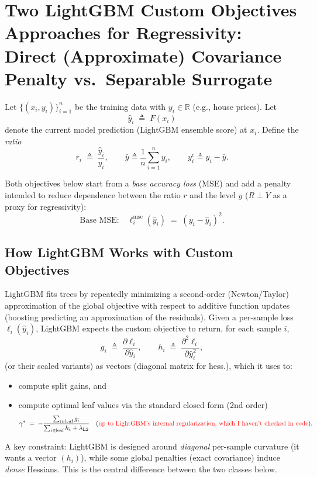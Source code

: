\documentclass[11pt]{article}
\theoremstyle{plain}
\theoremstyle{definition}
\newcommand{\1}{\mathbf{1}}
\begin{document}
\newpage 

\section{Two LightGBM Custom Objectives Approaches for Regressivity: Direct (Approximate) Covariance Penalty vs.\ Separable Surrogate}
\label{sec:cov_vs_surrogate_lgbm}

Let $\{(x_i,y_i)\}_{i=1}^n$ be the training data with $y_i\in\mathbb{R}$ (e.g., house prices). Let
\[
\hat y_i \;\triangleq\; F(x_i)
\]
denote the current model prediction (LightGBM ensemble score) at $x_i$. Define the \emph{ratio}
\[
r_i \;\triangleq\; \frac{\hat y_i}{y_i},
\qquad
\bar y \triangleq \frac{1}{n}\sum_{i=1}^n y_i,
\qquad
y_i^c \triangleq y_i-\bar y.
\]

Both objectives below start from a \emph{base accuracy loss} (MSE) and add a penalty intended to reduce dependence between the ratio $r$ and the level $y$ ($R \perp Y $ as a proxy for regressivity):
\[
\text{Base MSE:}\quad \ell_i^{\mathrm{mse}}(\hat y_i) \;=\; (y_i-\hat y_i)^2.
\]

\subsection{How LightGBM Works with Custom Objectives}
\label{subsec:lgbm_custom_obj}

LightGBM fits trees by repeatedly minimizing a second-order (Newton/Taylor) approximation of the global objective with respect to additive function updates (boosting predicting an approximation of the residuals). Given a per-sample loss $\ell_i(\hat y_i)$, LightGBM expects the custom objective to return, for each sample $i$,
\[
g_i \;\triangleq\; \frac{\partial \ell_i}{\partial \hat y_i},
\qquad
h_i \;\triangleq\; \frac{\partial^2 \ell_i}{\partial \hat y_i^2},
\]
(or their scaled variants) {\color{red} as vectors (diagonal matrix for hess.)}, which it uses to:
\begin{itemize}
  \item compute split gains, and
  \item compute optimal leaf values via the standard closed form (2nd order)
  \[
  \gamma^* \;=\; -\frac{\sum_{i\in \text{leaf}} g_i}{\sum_{i\in \text{leaf}} h_i + \lambda_{\mathrm{L2}}}
  \quad
  (\text{\color{red} up to LightGBM's internal regularization, which I haven't checked in code}).
  \]
\end{itemize}
A key constraint: LightGBM is designed around \emph{diagonal} per-sample curvature (it wants a vector $(h_i)$), while some global penalties {\color{red} (exact covariance)} induce \emph{dense} Hessians. This is the central difference between the two classes below.
\end{document}
